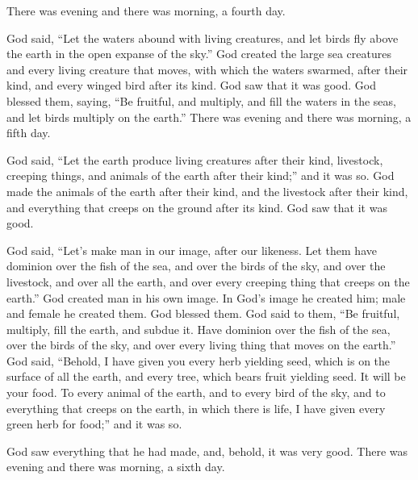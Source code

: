 {There was evening and there was morning, a fourth day.
\par }{\PP {}God said, “Let the waters abound with living creatures, and let birds fly above the earth in the open expanse of the sky.”
God created the large sea creatures and every living creature that moves, with which the waters swarmed, after their kind, and every winged bird after its kind. God saw that it was good.
God blessed them, saying, “Be fruitful, and multiply, and fill the waters in the seas, and let birds multiply on the earth.”
There was evening and there was morning, a fifth day.
\par }{\PP {}God said, “Let the earth produce living creatures after their kind, livestock, creeping things, and animals of the earth after their kind;” and it was so.
God made the animals of the earth after their kind, and the livestock after their kind, and everything that creeps on the ground after its kind. God saw that it was good.
\par }{\PP {}God said, “Let’s make man in our image, after our likeness. Let them have dominion over the fish of the sea, and over the birds of the sky, and over the livestock, and over all the earth, and over every creeping thing that creeps on the earth.”
God created man in his own image. In God’s image he created him; male and female he created them.
God blessed them. God said to them, “Be fruitful, multiply, fill the earth, and subdue it. Have dominion over the fish of the sea, over the birds of the sky, and over every living thing that moves on the earth.”
God said, “Behold, I have given you every herb yielding seed, which is on the surface of all the earth, and every tree, which bears fruit yielding seed. It will be your food.
To every animal of the earth, and to every bird of the sky, and to everything that creeps on the earth, in which there is life, I have given every green herb for food;” and it was so.
\par }{\PP {}God saw everything that he had made, and, behold, it was very good. There was evening and there was morning, a sixth day.

}

